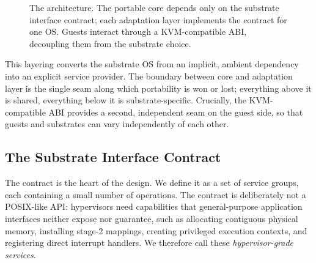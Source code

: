 \begin{figure}[t]
  \centering
  \caption{The \axvisor{} architecture. The portable core depends only on the
  substrate interface contract; each adaptation layer implements the contract
  for one OS. Guests interact through a KVM-compatible ABI, decoupling them from
  the substrate choice.}
  \label{fig:arch}
\end{figure}

This layering converts the substrate OS from an implicit, ambient dependency
into an explicit service provider. The boundary between core and adaptation
layer is the single seam along which portability is won or lost; everything
above it is shared, everything below it is substrate-specific. Crucially, the
KVM-compatible ABI provides a second, independent seam on the guest side, so
that guests and substrates can vary independently of each other.

\subsection{The Substrate Interface Contract}
\label{sec:contract}

The contract is the heart of the design. We define it as a set of service
groups, each containing a small number of operations. The contract is
deliberately not a POSIX-like API: hypervisors need capabilities that
general-purpose application interfaces neither expose nor guarantee, such as
allocating contiguous physical memory, installing stage-2 mappings, creating
privileged execution contexts, and registering direct interrupt handlers. We
therefore call these \emph{hypervisor-grade services}.

